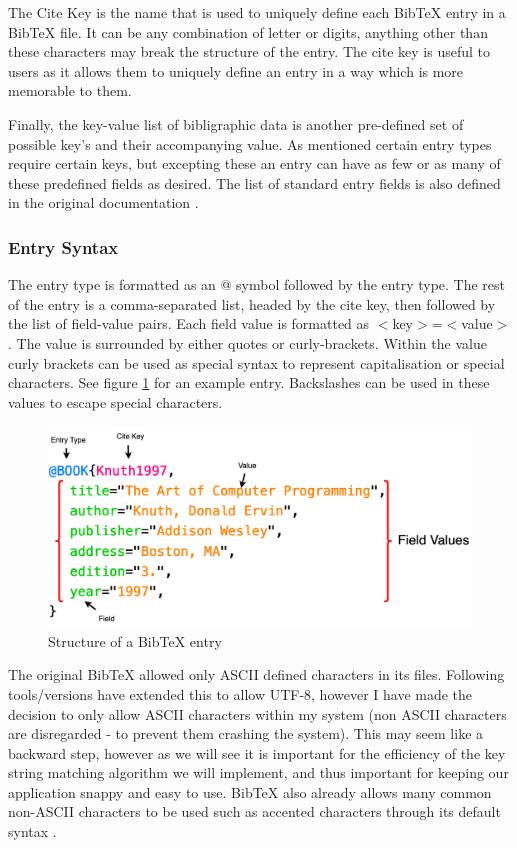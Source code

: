 \documentclass[a4paper,11pt]{article}
\begin{document}
The Cite Key is the name that is used to uniquely define each BibTeX entry in a BibTeX file. It can be any combination of letter or digits, anything other than these characters may break the structure of the entry. The cite key is useful to users as it allows them to uniquely define an entry in a way which is more memorable to them. 

Finally, the key-value list of bibligraphic data is another pre-defined set of possible key's and their accompanying value. As mentioned certain entry types require certain keys, but excepting these an entry can have as few or as many of these predefined fields as desired. The list of standard entry fields is also defined in the original documentation \citep{bibtexOfficialDocumentation}.

\subsubsection{Entry Syntax}
The entry type is formatted as an @ symbol followed by the entry type. The rest of the entry is a comma-separated list, headed by the cite key, then followed by the list of field-value pairs. Each field value is formatted as $<$key$>$=$<$value$>$. The value is surrounded by either quotes or curly-brackets. Within the value curly brackets can be used as special syntax to represent capitalisation or special characters. See figure \ref{fig:bibTeXEntryStructure} for an example entry. Backslashes can be used in these values to escape special characters.

\begin{figure}
    \centering
    \includegraphics[width=0.8\linewidth]{diagrams/bibtexStructure.drawio.png}
    \caption{Structure of a BibTeX entry}
    \label{fig:bibTeXEntryStructure}
\end{figure}

The original BibTeX allowed only ASCII defined characters in its files. Following tools/versions have extended this to allow UTF-8, however I have made the decision to only allow ASCII characters within my system (non ASCII characters are disregarded - to prevent them crashing the system). This may seem like a backward step, however as we will see it is important for the efficiency of the key string matching algorithm we will implement, and thus important for keeping our application snappy and easy to use. BibTeX also already allows many common non-ASCII characters to be used such as accented characters through its default syntax \citep{bibtexSpecialCharacters}.
\end{document}
